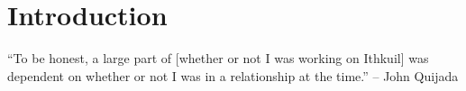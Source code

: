 \chapter{Introduction}

``To be honest, a large part of [whether or not I was working on Ithkuil] was dependent on whether or not I was in a relationship at the time.'' -- John Quijada